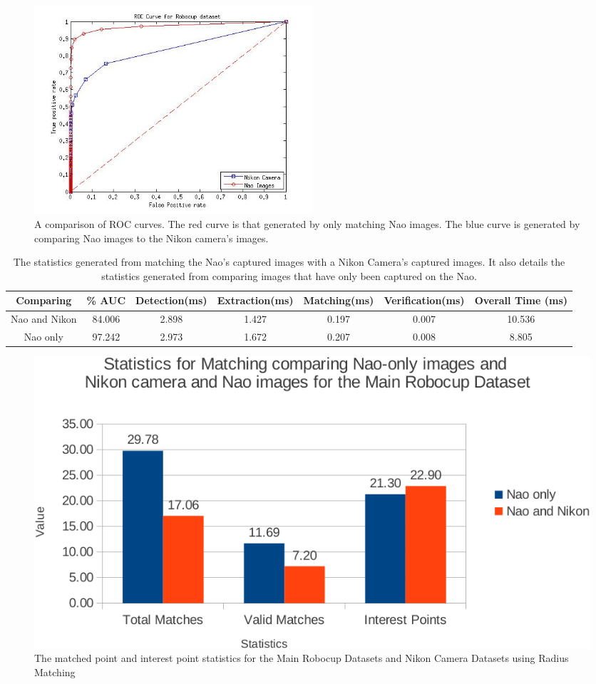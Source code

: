 \documentclass[11pt]{report}
\begin{document}
\begin{figure}[h!] 
  \centering
    \includegraphics[width=0.5\textwidth]{../Drawings/camera/ROC_Robocup.jpg}
    \caption{A comparison of ROC curves. The red curve is that generated by only matching Nao images. The blue curve is generated by comparing Nao images to the Nikon camera's images. }
    \label{fig:rocRobocupNikon}
\end{figure}

\begin{table}
\caption{The statistics generated from matching the Nao's captured images with
a Nikon Camera's captured images. It also details the statistics generated from comparing images that have only been captured on the Nao.}
\begin{tabular}{|c|c|c|c|c|c|c|}
\hline 
Comparing & \% AUC & Detection(ms) & Extraction(ms) & Matching(ms) & Verification(ms) & Overall Time (ms)\tabularnewline
\hline 
\hline 
Nao and Nikon & 84.006 & 2.898 & 1.427 & 0.197 & 0.007 & 10.536\tabularnewline
\hline 
Nao only & 97.242 & 2.973 & 1.672 & 0.207 & 0.008 & 8.805\tabularnewline
\hline 
\end{tabular}
\label{tab:naoNikonRobocup}
\end{table}

\begin{figure}[h!] 
  \centering
    \includegraphics[width=1.0\textwidth]{../Drawings/Graphs/nikon_mrb_matches_keypoints_best.pdf}
    \caption{The matched point and interest point statistics for the Main Robocup Datasets
and Nikon Camera Datasets using Radius Matching}
    \label{fig:nikon_mrb_matches_keypoints}
\end{figure}
\end{document}
